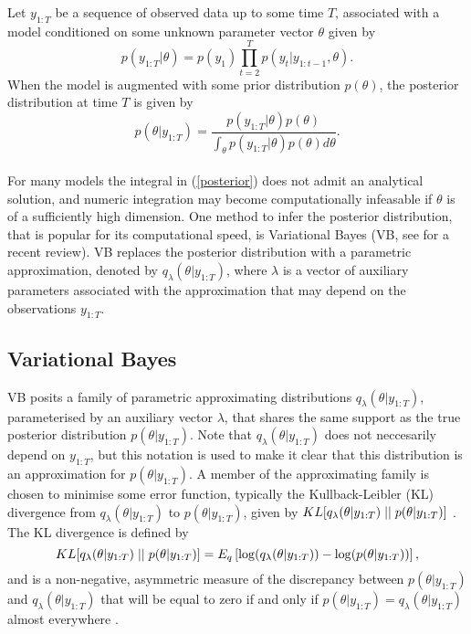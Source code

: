 \documentclass[12pt,a4paper]{article}\usepackage[]{graphicx}\usepackage[]{color}
\begin{document}
Let $y_{1:T}$ be a sequence of observed data up to some time $T$, associated with a model conditioned on some unknown parameter vector $\theta$ given by
\begin{equation}
\label{likelihood}
p(y_{1:T} | \theta) = p(y_1) \prod_{t=2}^{T} p(y_t | y_{1:t-1}, \theta).
\end{equation}
When the model is augmented with some prior distribution $p(\theta)$, the posterior distribution at time $T$ is given by
\begin{equation}
\label{posterior}
p(\theta | y_{1:T}) = \frac{p(y_{1:T} | \theta)p(\theta)}{\int_{\theta}p(y_{1:T} | \theta)p(\theta)d\theta}.
\end{equation}
\\

For many models the integral in (\ref{posterior}) does not admit an analytical solution, and numeric integration may become computationally infeasable if $\theta$ is of a sufficiently high dimension. One method to infer the posterior distribution, that is popular for its computational speed, is Variational Bayes (VB, see \citet{Blei2017} for a recent review). VB replaces the posterior distribution with a parametric approximation, denoted by $q_{\lambda}(\theta |y_{1:T})$, where $\lambda$ is a vector of auxiliary parameters associated with the approximation that may depend on the observations $y_{1:T}$.

\subsection{Variational Bayes}
\label{subsec:VB}

VB posits a family of parametric approximating distributions $q_{\lambda}(\theta |y_{1:T})$, parameterised by an auxiliary vector $\lambda$, that shares the same support as the true posterior distribution $p(\theta |y_{1:T})$. Note that $q_{\lambda}(\theta |y_{1:T})$ does not neccesarily depend on $y_{1:T}$, but this notation is used to make it clear that this distribution is an approximation for $p(\theta |y_{1:T})$. A member of the approximating family is chosen to minimise some error function, typically the Kullback-Leibler (KL) divergence from $q_{\lambda}(\theta |y_{1:T})$ to $p(\theta |y_{1:T})$, given by $KL[q_{\lambda}(\theta |y_{1:T})\hspace{.1cm}||\hspace{.1cm}p(\theta |y_{1:T})]$ \citep{Kullback1951}. The KL divergence is defined by
\begin{equation}
\label{KL-def}
KL[q_{\lambda}(\theta |y_{1:T})\hspace{.1cm}||\hspace{.1cm}p(\theta |y_{1:T})] = E_q \left[ \log(q_{\lambda}(\theta |y_{1:T})) - \log(p(\theta |y_{1:T})) \right],
\end{equation}
and is a non-negative, asymmetric measure of the discrepancy between $p(\theta |y_{1:T})$ and $q_{\lambda}(\theta | y_{1:T})$  that will be equal to zero if and only if $p(\theta | y_{1:T}) = q_{\lambda}(\theta | y_{1:T})$ almost everywhere \citep{Bishop2006}.
\\
\end{document}
